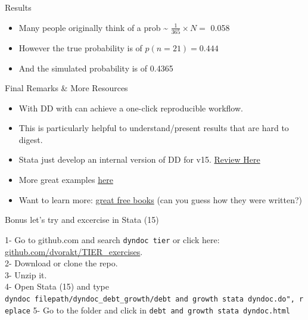 \documentclass[ignorenonframetext,]{beamer}
\providecommand{\tightlist}{%
  \setlength{\itemsep}{0pt}\setlength{\parskip}{0pt}}
\begin{document}
\begin{frame}{Results}
\protect\hypertarget{results}{}

\begin{itemize}
\tightlist
\item
  Many people originally think of a prob \textasciitilde{}
  \(\frac{1}{365} \times N =\) 0.058
\item
  However the true probability is of \(p(n= 21) = 0.444\)
\item
  And the simulated probability is of 0.4365
\end{itemize}

\end{frame}

\begin{frame}{Final Remarks \& More Resources}
\protect\hypertarget{final-remarks-more-resources}{}

\begin{itemize}
\tightlist
\item
  With DD with can achieve a one-click reproducible workflow.
\item
  This is particularly helpful to understand/present results that are
  hard to digest.
\item
  Stata just develop an internal version of DD for v15.
  \href{https://www.bitss.org/2017/09/05/review-of-statas-dyndoc/}{Review
  Here}
\item
  More great examples
  \href{https://github.com/BITSS/Annual2017/tree/master/3-Rmarkdown}{here}
\item
  Want to learn more: \href{https://bookdown.org/}{great free books}
  (can you guess how they were written?)
\end{itemize}

\end{frame}

\begin{frame}[fragile]{Bonus let's try and excercise in Stata (15)}
\protect\hypertarget{bonus-lets-try-and-excercise-in-stata-15}{}

1- Go to github.com and search \texttt{dyndoc\ tier} or click here:
\href{https://github.com/dvorakt/TIER_exercises}{github.com/dvorakt/TIER\_exercises}.\\
2- Download or clone the repo.\\
3- Unzip it.\\
4- Open Stata (15) and type
\texttt{dyndoc\ filepath/dyndoc\_debt\_growth/debt\ and\ growth\ stata\ dyndoc.do",\ replace}
5- Go to the folder and click in
\texttt{debt\ and\ growth\ stata\ dyndoc.html}

\end{frame}
\end{document}
